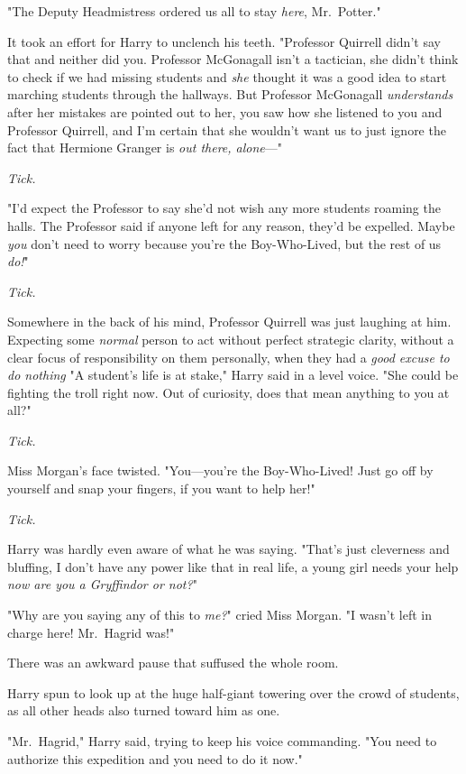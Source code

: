 "The Deputy Headmistress ordered us all to stay \emph{here}, Mr.~Potter."

It took an effort for Harry to unclench his teeth. "Professor Quirrell didn't
say that and neither did you. Professor McGonagall isn't a tactician, she
didn't think to check if we had missing students and \emph{she} thought it was
a good idea to start marching students through the hallways. But Professor
McGonagall \emph{understands} after her mistakes are pointed out to her, you
saw how she listened to you and Professor Quirrell, and I'm certain that she
wouldn't want us to just ignore the fact that Hermione Granger is \emph{out
there, alone}—"

\emph{Tick.}

"I'd expect the Professor to say she'd not wish any more students roaming the
halls. The Professor said if anyone left for any reason, they'd be expelled.
Maybe \emph{you} don't need to worry because you're the Boy-Who-Lived, but the
rest of us \emph{do!}"

\emph{Tick.}

Somewhere in the back of his mind, Professor Quirrell was just laughing at him.
Expecting some \emph{normal} person to act without perfect strategic clarity,
without a clear focus of responsibility on them personally, when they had a
\emph{good excuse to do nothing{\el}} "A student's life is at stake," Harry
said in a level voice. "She could be fighting the troll right now. Out of
curiosity, does that mean anything to you at all?"

\emph{Tick.}

Miss Morgan's face twisted. "You—you're the Boy-Who-Lived! Just go off by
yourself and snap your fingers, if you want to help her!"

\emph{Tick.}

Harry was hardly even aware of what he was saying. "That's just cleverness and
bluffing, I don't have any power like that in real life, a young girl needs
your help \emph{now are you a Gryffindor or not?}"

"Why are you saying any of this to \emph{me?}" cried Miss Morgan. "I wasn't
left in charge here! Mr.~Hagrid was!"

There was an awkward pause that suffused the whole room.

Harry spun to look up at the huge half-giant towering over the crowd of
students, as all other heads also turned toward him as one.

"Mr.~Hagrid," Harry said, trying to keep his voice commanding. "You need to
authorize this expedition and you need to do it now."


